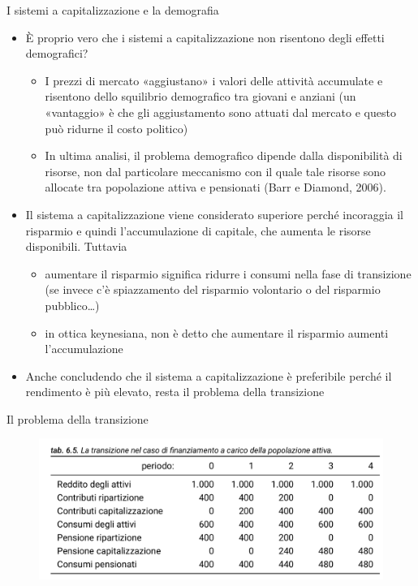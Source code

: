 \documentclass[11pt]{beamer}
\begin{document}
\begin{frame}{I sistemi a capitalizzazione e la demografia}
\begin{itemize}
\item È proprio vero che i sistemi a capitalizzazione non risentono degli effetti
demografici?
\begin{itemize}
\item I prezzi di mercato «aggiustano» i valori delle attività accumulate e
risentono dello squilibrio demografico tra giovani e anziani (un
«vantaggio» è che gli aggiustamento sono attuati dal mercato e questo può
ridurne il costo politico)
\item In ultima analisi, il problema demografico dipende dalla disponibilità di
risorse, non dal particolare meccanismo con il quale tale risorse sono
allocate tra popolazione attiva e pensionati (Barr e Diamond, 2006).
\end{itemize}
\item Il sistema a capitalizzazione viene considerato superiore perché incoraggia
il risparmio e quindi l'accumulazione di capitale, che aumenta le risorse
disponibili. Tuttavia
\begin{itemize}
\item aumentare il risparmio significa ridurre i consumi nella fase di
transizione (se invece c'è spiazzamento del risparmio volontario o del
risparmio pubblico\ldots{})
\item in ottica keynesiana, non è detto che aumentare il risparmio aumenti
l'accumulazione
\end{itemize}
\item Anche concludendo che il sistema a capitalizzazione è preferibile perché il
rendimento è più elevato, resta il problema della \alert{transizione}
\end{itemize}
\end{frame}

\begin{frame}{Il problema della transizione}
\begin{figure}[htbp]
\centering
\includegraphics[width=\textwidth]{./figure/transizione-alla-capitalizzazione-1.png}
\end{figure}
\end{frame}
\end{document}
